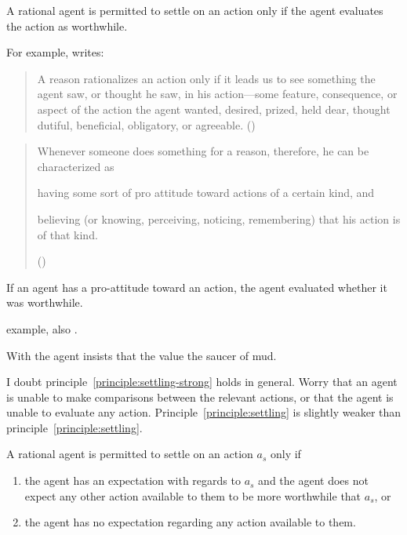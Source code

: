 \documentclass[10pt]{article}
\newcommand{\hozlinedash}[0]{%
  \noindent\hdashrule[0.5ex][c]{\textwidth}{.1pt}{2.5pt}
}
\begin{document}
\hozlinedash

\begin{principle}\label{principle:settling-strong}
  A rational agent is permitted to settle on an action only if the agent evaluates the action as worthwhile.
\end{principle}

\hozlinedash

For example, \citeauthor{Davidson:1963aa} writes:

\begin{quote}
  A reason rationalizes an action only if it leads us to see something the agent saw, or thought he saw, in his action---some feature, consequence, or aspect of the action the agent wanted, desired, prized, held dear, thought dutiful, beneficial, obligatory, or agreeable.\nolinebreak
  \mbox{}\hfill\mbox{(\citeyear[686]{Davidson:1963aa})}
\end{quote}

\begin{quote}
  Whenever someone does something for a reason, therefore, he can be characterized as
  \begin{enumerate*}[label=(\alph*), ref=(\alph*)]
  \item\label{davidson:a} having some sort of pro attitude toward actions of a certain kind, and
  \item\label{davidson:b} believing (or knowing, perceiving, noticing, remembering) that his action is of that kind.
  \end{enumerate*}
  \mbox{}\hfill\mbox{(\citeyear[686--686]{Davidson:1963aa})}
\end{quote}

If an agent has a pro-attitude toward an action, the agent evaluated whether it was worthwhile.


\citeauthor{Anscombe:1957aa} example, also \citeauthor{Quinn:1993aa}.

With \citeauthor{Anscombe:1957aa} the agent insists that the value the saucer of mud.

\hozlinedash

I doubt principle~\ref{principle:settling-strong} holds in general.
Worry that an agent is unable to make comparisons between the relevant actions, or that the agent is unable to evaluate any action.
Principle~\ref{principle:settling} is slightly weaker than principle~\ref{principle:settling}.

\begin{principle}[Settling]\label{principle:settling}
  A rational agent is permitted to settle on an action \(a_{s}\) only if
  \begin{enumerate}
  \item the agent has an expectation with regards to \(a_{s}\) and the agent does not expect any other action available to them to be more worthwhile that \(a_{s}\), or
  \item the agent has no expectation regarding any action available to them.
  \end{enumerate}
\end{principle}
\end{document}
